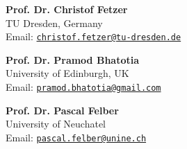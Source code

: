 \documentclass[letterpaper]{article}
\renewenvironment{itemize}{
  \begin{list}{}{
    \setlength{\leftmargin}{1.5em}
  }
}{
  \end{list}
}
\begin{document}
\begin{itemize}

\item {\bf Prof. Dr. Christof Fetzer }  \\
TU Dresden, Germany\\
Email: \href{mailto:christof.fetzer@tu-dresden.de}{\tt christof.fetzer@tu-dresden.de}
      
\item {\bf  Prof. Dr. Pramod Bhatotia }  \\
University of Edinburgh, UK\\
Email: \href{mailto:pramod.bhatotia@gmail.com}{\tt pramod.bhatotia@gmail.com}

\item {\bf Prof. Dr. Pascal Felber} \\
University of Neuchatel\\
Email: \href{mailto:pascal.felber@unine.ch}{\tt pascal.felber@unine.ch}

\end{itemize}
\end{document}
